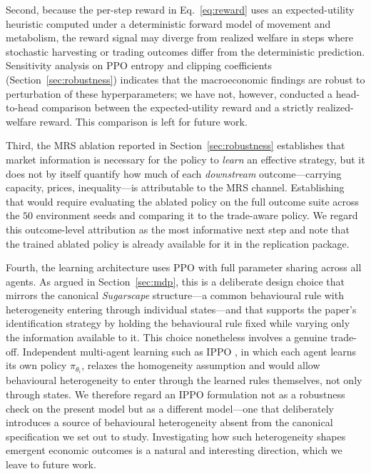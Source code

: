 \documentclass[pdflatex,sn-mathphys-num]{sn-jnl}%
\theoremstyle{thmstyleone}%
\theoremstyle{thmstyletwo}%
\theoremstyle{thmstylethree}%
\begin{document}
Second, because the per-step reward in Eq.~\eqref{eq:reward} uses an expected-utility heuristic computed under a deterministic forward model of movement and metabolism, the reward signal may diverge from realized welfare in steps where stochastic harvesting or trading outcomes differ from the deterministic prediction.  
Sensitivity analysis on PPO entropy and clipping coefficients (Section~\ref{sec:robustness}) indicates that the macroeconomic findings are robust to perturbation of these hyperparameters; we have not, however, conducted a head-to-head comparison between the expected-utility reward and a strictly realized-welfare reward.  
This comparison is left for future work.

Third, the MRS ablation reported in Section~\ref{sec:robustness} establishes that market information is necessary for the policy to \emph{learn} an effective strategy, but it does not by itself quantify how much of each \emph{downstream} outcome---carrying capacity, prices, inequality---is attributable to the MRS channel.
Establishing that would require evaluating the ablated policy on the full outcome suite across the $50$ environment seeds and comparing it to the trade-aware policy.
We regard this outcome-level attribution as the most informative next step and note that the trained ablated policy is already available for it in the replication package.

Fourth, the learning architecture uses PPO with full parameter sharing across all agents.  
As argued in Section~\ref{sec:mdp}, this is a deliberate design choice that mirrors the canonical \textit{Sugarscape} structure---a common behavioural rule with heterogeneity entering through individual states---and that supports the paper's identification strategy by holding the behavioural rule fixed while varying only the information available to it.  
This choice nonetheless involves a genuine trade-off.  
Independent multi-agent learning such as IPPO \citep{deWitt2020}, in which each agent learns its own policy $\pi_{\theta_i}$, relaxes the homogeneity assumption and would allow behavioural heterogeneity to enter through the learned rules themselves, not only through states.  
We therefore regard an IPPO formulation not as a robustness check on the present model but as a different model---one that deliberately introduces a source of behavioural heterogeneity absent from the canonical specification we set out to study. Investigating how such heterogeneity shapes emergent economic outcomes is a natural and interesting direction, which we leave to future work.
\end{document}
